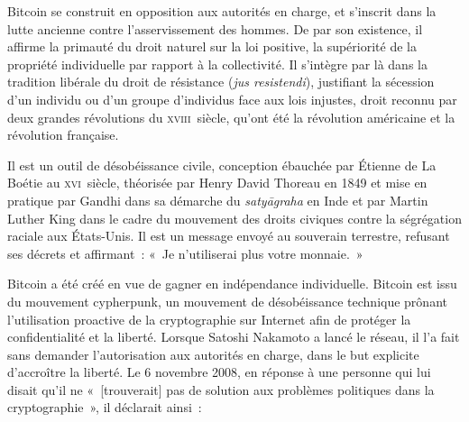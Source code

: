 Bitcoin se construit en opposition aux autorités en charge, et s'inscrit dans la lutte ancienne contre l'asservissement des hommes. De par son existence, il affirme la primauté du droit naturel sur la loi positive, la supériorité de la propriété individuelle par rapport à la collectivité. Il s'intègre par là dans la tradition libérale du droit de résistance (\emph{jus resistendi}), justifiant la sécession d'un individu ou d'un groupe d'individus face aux lois injustes, droit reconnu par deux grandes révolutions du \textsc{xviii}\ieme{}~siècle, qu'ont été la révolution américaine et la révolution française.

Il est un outil de désobéissance civile, conception ébauchée par Étienne de La Boétie au  \textsc{xvi}\ieme{}~siècle, théorisée par Henry David Thoreau en 1849 et mise en pratique par Gandhi dans sa démarche du \emph{satyāgraha} en Inde et par Martin Luther King dans le cadre du mouvement des droits civiques contre la ségrégation raciale aux États-Unis. Il est un message envoyé au souverain terrestre, refusant ses décrets et affirmant~: «~Je n'utiliserai plus votre monnaie.~»


Bitcoin a été créé en vue de gagner en indépendance individuelle. Bitcoin est issu du mouvement cypherpunk, un mouvement de désobéissance technique prônant l'utilisation proactive de la cryptographie sur Internet afin de protéger la confidentialité et la liberté. Lorsque Satoshi Nakamoto a lancé le réseau, il l'a fait sans demander l'autorisation aux autorités en charge, dans le but explicite d'accroître la liberté. Le 6 novembre 2008, en réponse à une personne qui lui disait qu'il ne «~[trouverait] pas de solution aux problèmes politiques dans la cryptographie~», il déclarait ainsi~:

